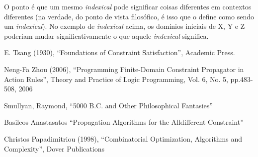 \documentclass{article}
\begin{document}
O ponto é que um mesmo \textit{indexical} pode significar coisas diferentes em contextos diferentes (na verdade, do ponto de vista filosófico, é isso que o define como sendo um \textit{indexical}). No exemplo de \textit{indexical} acima, os domínios iniciais de X, Y e Z poderiam
mudar significativamente o que aquele \textit{indexical} significa.






  \begin{thebibliography}{1}

      E. Tsang (1930), ``Foundations of Constraint Satisfaction'', Academic Press.

      Neng-Fa Zhou (2006), ``Programming Finite-Domain Constraint Propagator in Action Rules'', Theory and Practice of Logic Programming, Vol. 6, No. 5, pp.483-508, 2006

      Smullyan, Raymond, ``5000 B.C. and Other Philosophical Fantasies''

      Basileos Anastasatos ``Propagation Algorithms for the Alldifferent Constraint''

      Christos Papadimitriou (1998), ``Combinatorial Optimization, Algorithms and Complexity'', Dover Publications


  \end{thebibliography}
\end{document}
